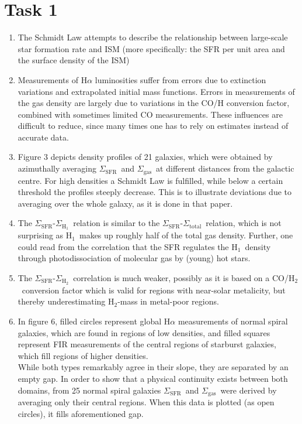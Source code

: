 \documentclass[11pt,a4paper]{scrartcl}
\newcommand{\SFR}{\ensuremath{\Sigma_{\mathrm{SFR}}}}
\newcommand{\ISM}{\ensuremath{\Sigma_{\mathrm{gas}}}}
\newcommand{\ISMtotal}{\ensuremath{\Sigma_{\mathrm{total}}}}
\newcommand{\ISMHI}{\ensuremath{\Sigma_{\mathrm{H}_1}}}
\newcommand{\ISMHII}{\ensuremath{\Sigma_{\mathrm{H}_2}}}
\newcommand{\HI}{\ensuremath{\mathrm{H}_1}}
\newcommand{\HII}{\ensuremath{\mathrm{H}_2}}
\begin{document}
\section*{Task 1}

\begin{enumerate}[label=\textbf{\large(\alph*)}, itemsep=.5\baselineskip]

\item
    The Schmidt Law attempts to describe the relationship between large-scale
    star formation rate and ISM (more specifically: the SFR per unit area and
    the surface density of the ISM)

\item
    Measurements of H$\alpha$ luminosities suffer from errors due to extinction
    variations and extrapolated initial mass functions. Errors in measurements
    of the gas density are largely due to variations in the CO/H conversion
    factor, combined with sometimes limited CO measurements. These influences
    are difficult to reduce, since many times one has to rely on estimates
    instead of accurate data.

\item
    Figure 3 depicts density profiles of 21 galaxies, which were
    obtained by azimuthally averaging \SFR~and \ISM~at different distances from
    the galactic centre. For high densities a Schmidt Law is fulfilled, while
    below a certain threshold the profiles steeply decrease. This is to
    illustrate deviations due to averaging over the whole galaxy, as it is
    done in that paper.

\item
    The \SFR-\ISMHI~relation is similar to the \SFR-\ISMtotal~relation, which
    is not surprising as \HI~makes up roughly half of the total gas
    density. Further, one could read from the correlation that the SFR
    regulates the \HI~density through photodissociation of molecular gas by
    (young) hot stars.

\item
    The \SFR-\ISMHII~correlation is much weaker, possibly as it is based on a
    CO/\HII~conversion factor which is valid for regions with near-solar
    metalicity, but thereby underestimating \HII-mass in metal-poor regions.

\item
    In figure 6, filled circles represent global H$\alpha$ measurements of normal
    spiral galaxies, which are found in regions of low densities, and filled
    squares represent FIR measurements of the central regions of starburst
    galaxies, which fill regions of higher densities. \\
    While both types remarkably agree in their slope, they are separated by an
    empty gap. In order to show that a physical continuity exists between both
    domains, from 25 normal spiral galaxies \SFR~and \ISM~were derived by
    averaging only their central regions. When this data is plotted (as open
    circles), it fills aforementioned gap.


\end{enumerate}
\end{document}
